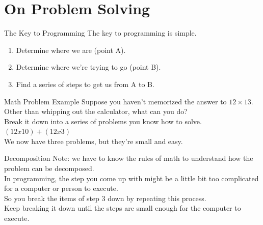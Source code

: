 \documentclass[aspectratio=169]{beamer}
\begin{document}
\section*{On Problem Solving}

\begin{frame}{The Key to Programming}
\large
The key to programming is simple. \\
\vspace{1em}
\begin{enumerate}
\item Determine where we are (point A).
\item Determine where we're trying to go (point B).
\item Find a series of steps to get us from A to B.
\end{enumerate}
\end{frame}


\begin{frame}{Math Problem Example}
\large
Suppose you haven't memorized the answer to $12 \times 13$.  \\
\vspace{1em}
Other than whipping out the calculator, what can you do? \\
\vspace{1em}
Break it down into a series of problems you know how to solve. \\
\vspace{0.25em}
$(12 x 10) + (12 x 3)$ \\
\vspace{1em}
We now have three problems, but they're small and easy. \\
\end{frame}




\begin{frame}{Decomposition}
Note: we have to know the rules of math to understand how the problem can be decomposed. \\
\vspace{1em}
In programming, the step you come up with might be a little bit too complicated for a computer or person to execute. \\
\vspace{1em}
So you break the items of step 3 down by repeating this process. \\
\vspace{1em}
Keep breaking it down until the steps are small enough for the computer to execute.
\end{frame}
\end{document}
